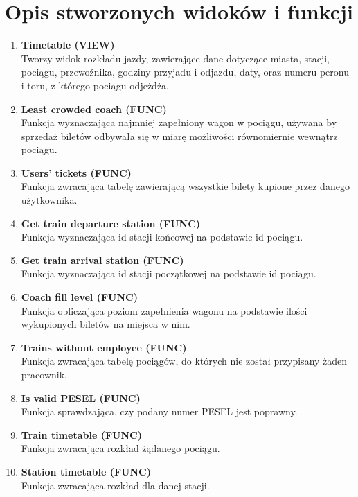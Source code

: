 \section{Opis stworzonych widoków i funkcji}
\begin{enumerate}
    \item \textbf{Timetable (VIEW)}\\
    Tworzy widok rozkładu jazdy, zawierające dane dotyczące miasta, stacji, pociągu, przewoźnika, godziny przyjadu i odjazdu, daty, oraz numeru peronu i toru, z którego pociągu odjeżdża.\\
    
    \item \textbf{Least crowded coach (FUNC)}\\
    Funkcja wyznaczająca najmniej zapełniony wagon w pociągu, używana by sprzedaż biletów odbywała się w miarę możliwości równomiernie wewnątrz pociągu.\\
    
    \item \textbf{Users' tickets (FUNC)}\\
    Funkcja zwracająca tabelę zawierającą wszystkie bilety kupione przez danego użytkownika.\\
    
    \item \textbf{Get train departure station (FUNC)}\\
    Funkcja wyznaczająca id stacji końcowej na podstawie id pociągu.\\
    
    \item \textbf{Get train arrival station (FUNC)}\\
    Funkcja wyznaczająca id stacji początkowej na podstawie id pociągu.\\
    
    \item \textbf{Coach fill level (FUNC)}\\
    Funkcja obliczająca poziom zapełnienia wagonu na podstawie ilości wykupionych biletów na miejsca w nim.\\
    
    \item \textbf{Trains without employee (FUNC)}\\
    Funkcja zwracająca tabelę pociągów, do których nie został przypisany żaden pracownik.\\
    
    \item \textbf{Is valid PESEL (FUNC)}\\
    Funkcja sprawdzająca, czy podany numer PESEL jest poprawny.\\
    
    \item \textbf{Train timetable (FUNC)}\\
    Funkcja zwracająca rozkład żądanego pociągu.\\
    
    \item \textbf{Station timetable (FUNC)}\\
    Funkcja zwracająca rozkład dla danej stacji.
\end{enumerate}

